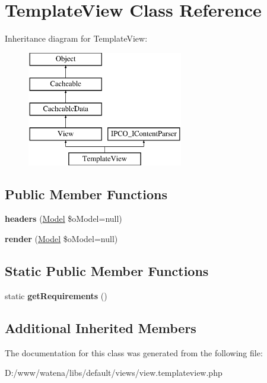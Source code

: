 \hypertarget{class_template_view}{\section{Template\-View Class Reference}
\label{class_template_view}
}
Inheritance diagram for Template\-View\-:\begin{figure}[H]
\begin{center}
\leavevmode
\includegraphics[height=5.000000cm]{class_template_view}
\end{center}
\end{figure}
\subsection*{Public Member Functions}
\begin{DoxyCompactItemize}
\item 
\hypertarget{class_template_view_aca97dea9322ad1ec0a908b2ead53c62b}{{\bfseries headers} (\hyperlink{class_model}{Model} \$o\-Model=null)}\label{class_template_view_aca97dea9322ad1ec0a908b2ead53c62b}

\item 
\hypertarget{class_template_view_ae4f03691b27e31440b91ab9419076dd9}{{\bfseries render} (\hyperlink{class_model}{Model} \$o\-Model=null)}\label{class_template_view_ae4f03691b27e31440b91ab9419076dd9}

\end{DoxyCompactItemize}
\subsection*{Static Public Member Functions}
\begin{DoxyCompactItemize}
\item 
\hypertarget{class_template_view_a6f30f299094c114e8428df0ff0605432}{static {\bfseries get\-Requirements} ()}\label{class_template_view_a6f30f299094c114e8428df0ff0605432}

\end{DoxyCompactItemize}
\subsection*{Additional Inherited Members}


The documentation for this class was generated from the following file\-:\begin{DoxyCompactItemize}
\item 
D\-:/www/watena/libs/default/views/view.\-templateview.\-php\end{DoxyCompactItemize}
